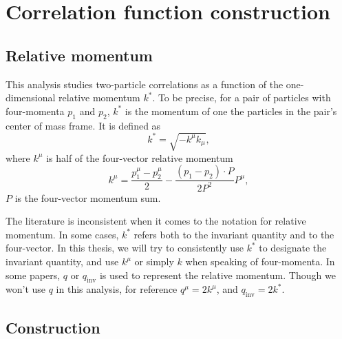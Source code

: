 \section{Correlation function construction}
\label{sec:CorrelationFunctionConstruction}
\subsection{Relative momentum}
\label{sec:RelativeMomentum}

This analysis studies two-particle correlations as a function of the one-dimensional relative momentum $k^*$.
To be precise, for a pair of particles with four-momenta $p_1$ and $p_2$, $k^*$ is the momentum of one the particles in the pair's center of mass frame.
It is defined as
\begin{equation}
\label{eq:kstar}
k^*= \sqrt{-k^\mu k_\mu},
\end{equation}
where $k^\mu$ is half of the four-vector relative momentum
\begin{equation}
\label{eq:kmu}
k^\mu = \frac{p_1^\mu - p_2^\mu}{2} -\frac{(p_1 - p_2)\cdot P}{2P^2}P^\mu,
\end{equation}
$P$ is the four-vector momentum sum.

The literature is inconsistent when it comes to the notation for relative momentum.
In some cases, $k^*$ refers both to the invariant quantity and to the four-vector.
In this thesis, we will try to consistently use $k^*$ to designate the invariant quantity, and use $k^\mu$ or simply $k$ when speaking of four-momenta.
In some papers, $q$ or $q_{\mathrm{inv}}$ is used to represent the relative momentum.
Though we won't use $q$ in this analysis, for reference
$q^\mu = 2k^\mu$, and $q_{\mathrm{inv}} = 2 k^*$.


\subsection{Construction}
\label{sec:CFconstruct}


